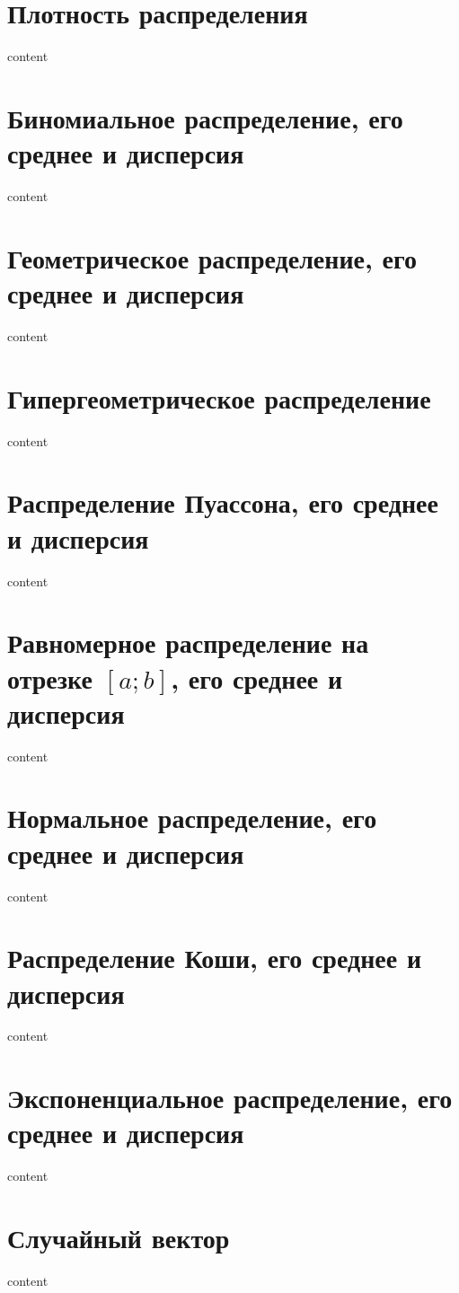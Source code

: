\section{Плотность распределения}

content

\section{Биномиальное распределение, его среднее и дисперсия}

content

\section{Геометрическое распределение, его среднее и дисперсия}

content

\section{Гипергеометрическое распределение}

content

\section{Распределение Пуассона, его среднее и дисперсия}

content

\section{Равномерное распределение на отрезке $[a ; b]$, его среднее и дисперсия}

content

\section{Нормальное распределение, его среднее и дисперсия}

content

\section{Распределение Коши, его среднее и дисперсия}

content

\section{Экспоненциальное распределение, его среднее и дисперсия}

content

\section{Случайный вектор}

content
